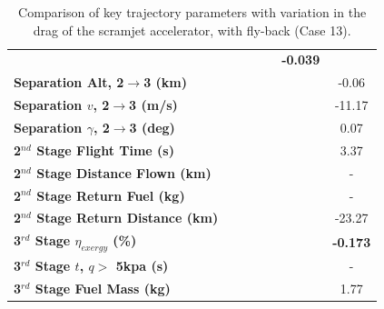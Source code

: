 \begin{table}[ht]
\begin{tabular}{l c c c c c c}
		& \textbf{\secondExergyEffCdNinetyFive}
		& \textbf{\secondExergyEffCdStandard}
		& \textbf{\secondExergyEffCdOneHundredFive}
		& \textbf{\secondExergyEffCdOneHundredTen}
		& \textbf{-0.039}
		\\
		\textbf{Separation Alt, 2$\rightarrow$3 (km)}
		& \secondthirdSeparationAltCdNinety
		& \secondthirdSeparationAltCdNinetyFive
		& \secondthirdSeparationAltCdStandard
		& \secondthirdSeparationAltCdOneHundredFive
		& \secondthirdSeparationAltCdOneHundredTen
		&-0.06
		\\
		\textbf{Separation $v$, 2$\rightarrow$3 (m/s)}
		& \secondthirdSeparationvCdNinety
		& \secondthirdSeparationvCdNinetyFive
		& \secondthirdSeparationvCdStandard
		& \secondthirdSeparationvCdOneHundredFive
		& \secondthirdSeparationvCdOneHundredTen
		&-11.17
		\\
		\textbf{Separation $\gamma$, 2$\rightarrow$3 (deg)}
		& \secondthirdSeparationgammaCdNinety
		& \secondthirdSeparationgammaCdNinetyFive
		& \secondthirdSeparationgammaCdStandard
		& \secondthirdSeparationgammaCdOneHundredFive
		& \secondthirdSeparationgammaCdOneHundredTen
		&0.07
		\\
		\textbf{2$^{nd}$ Stage Flight Time (s)}
		& \secondFlightTimeCdNinety
		& \secondFlightTimeCdNinetyFive
		& \secondFlightTimeCdStandard
		& \secondFlightTimeCdOneHundredFive
		& \secondFlightTimeCdOneHundredTen
		&3.37
		\\
		\textbf{2$^{nd}$ Stage Distance Flown (km)}
		& \SecondDistCdNinety
		& \SecondDistCdNinetyFive
		& \SecondDistCdStandard
		& \SecondDistCdOneHundredFive
		& \SecondDistCdOneHundredTen
		& -
		\\
		\textbf{2$^{nd}$ Stage Return Fuel (kg)}
		& \returnFuelCdNinety
		& \returnFuelCdNinetyFive
		& \returnFuelCdStandard
		& \returnFuelCdOneHundredFive
		& \returnFuelCdOneHundredTen
		& -
		\\
		\textbf{2$^{nd}$ Stage Return Distance (km)}
		& \returnDistCdNinety
		& \returnDistCdNinetyFive
		& \returnDistCdStandard
		& \returnDistCdOneHundredFive
		& \returnDistCdOneHundredTen
		&-23.27
		\\
		\hline 
		\textbf{3$^{rd}$ Stage $\eta_{exergy}$ (\%)}
		& \textbf{\thirddExergyEffCdNinety}
		& \textbf{\thirddExergyEffCdNinetyFive}
		& \textbf{\thirddExergyEffCdStandard}
		& \textbf{\thirddExergyEffCdOneHundredFive}
		& \textbf{\thirddExergyEffCdOneHundredTen}
		& \textbf{-0.173}
		\\
		\textbf{3$^{rd}$ Stage $t$, $q >$ 5kpa (s)}
		& \thirdqOverFiveCdNinety
		& \thirdqOverFiveCdNinetyFive
		& \thirdqOverFiveCdStandard
		& \thirdqOverFiveCdOneHundredFive
		& \thirdqOverFiveCdOneHundredTen
		& -
		\\
		\textbf{3$^{rd}$ Stage Fuel Mass (kg)}
		& \thirdmFuelCdNinety
		& \thirdmFuelCdNinetyFive
		& \thirdmFuelCdStandard
		& \thirdmFuelCdOneHundredFive
		& \thirdmFuelCdOneHundredTen
		& 1.77
		\\
		\hline 
	\end{tabular} 
	\caption{Comparison of key trajectory parameters with variation in the drag of the scramjet accelerator, with fly-back (Case 13).}
	\label{tab:comparison41}
\end{table}


